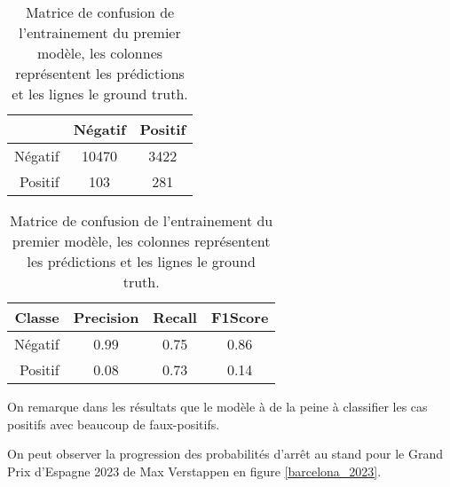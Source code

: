 \begin{table}[H]
    \begin{center}
        \caption{\label{rf_matrix}Matrice de confusion de l'entrainement du premier modèle, les colonnes représentent les prédictions et les lignes le ground truth.}
        \begin{tabular}{r|cc}
                    & Négatif & Positif \\ \hline
            Négatif & 10470   & 3422    \\
            Positif & 103     & 281     \\
        \end{tabular}
    \end{center}
\end{table}

\begin{table}[H]
    \begin{center}
        \caption{\label{rf_results}Matrice de confusion de l'entrainement du premier modèle, les colonnes représentent les prédictions et les lignes le ground truth.}
        \begin{tabular}{r|ccc}
            Classe  & Precision & Recall & F1Score \\ \hline
            Négatif & 0.99      & 0.75   & 0.86    \\
            Positif & 0.08      & 0.73   & 0.14    \\
        \end{tabular}
    \end{center}
\end{table}


On remarque dans les résultats que le modèle à de la peine à classifier les cas positifs avec beaucoup de faux-positifs.

On peut observer la progression des probabilités d'arrêt au stand pour le Grand Prix d'Espagne 2023 de Max Verstappen en figure \ref{barcelona_2023}.


